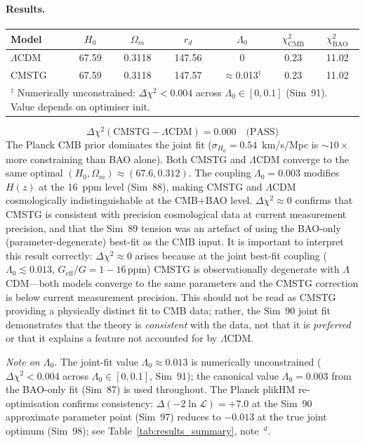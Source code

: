 \documentclass[12pt,a4paper]{article}
\begin{document}
\paragraph{Results.}
\begin{center}
\begin{tabular}{lcccccc}
\toprule
Model & $H_0$ & $\Omega_m$ & $r_d$ & $\Lambda_0$ & $\chi^2_{\mathrm{CMB}}$ & $\chi^2_{\mathrm{BAO}}$ \\
\midrule
$\Lambda$CDM & 67.59 & 0.3118 & 147.56 & 0 & 0.23 & 11.02 \\
CMSTG & 67.59 & 0.3118 & 147.57 & $\approx$0.013$^\dagger$ & 0.23 & 11.02 \\
\bottomrule
\multicolumn{7}{l}{\footnotesize $^\dagger$ Numerically unconstrained: $\Delta\chi^2<0.004$ across $\Lambda_0\in[0,0.1]$ (Sim~91). Value depends on optimiser init.} \\
\end{tabular}
\end{center}
\begin{equation*}
\Delta\chi^2(\mathrm{CMSTG} - \Lambda\mathrm{CDM}) = \mathbf{0.000} \quad\text{(PASS)}
\end{equation*}
The Planck CMB prior dominates the joint fit ($\sigma_{H_0} = 0.54$~km/s/Mpc
is $\sim 10\times$ more constraining than BAO alone). Both CMSTG and $\Lambda$CDM
converge to the same optimal $(H_0, \Omega_m) \approx (67.6, 0.312)$. The coupling
$\Lambda_0 = 0.003$ modifies $H(z)$ at the 16~ppm level (Sim~88), making CMSTG
and $\Lambda$CDM cosmologically indistinguishable at the CMB+BAO level.
$\Delta\chi^2 \approx 0$ confirms that CMSTG is consistent with precision cosmological
data at current measurement precision, and that the Sim~89 tension was an artefact
of using the BAO-only (parameter-degenerate) best-fit as the CMB input.
It is important to interpret this result correctly: $\Delta\chi^2 \approx 0$ arises
because at the joint best-fit coupling ($\Lambda_0 \lesssim 0.013$,
$G_{\mathrm{eff}}/G = 1 - 16\,\mathrm{ppm}$) CMSTG is observationally degenerate
with $\Lambda$CDM---both models converge to the same parameters and the CMSTG
correction is below current measurement precision.  This should not be read as
CMSTG providing a physically distinct fit to CMB data; rather, the Sim~90 joint
fit demonstrates that the theory is \emph{consistent} with the data, not that
it is \emph{preferred} or that it explains a feature not accounted for by $\Lambda$CDM.

\emph{Note on $\Lambda_0$.} The joint-fit value $\Lambda_0 \approx 0.013$ is numerically unconstrained ($\Delta\chi^2 < 0.004$ across $\Lambda_0 \in [0,0.1]$, Sim~91); the canonical value $\Lambda_0 = 0.003$ from the BAO-only fit (Sim~87) is used throughout. The Planck plikHM re-optimisation confirms consistency: $\Delta(-2\ln\mathcal{L}) = +7.0$ at the Sim~90 approximate parameter point (Sim~97) reduces to $-0.013$ at the true joint optimum (Sim~98); see Table~\ref{tab:results_summary}, note~$^d$.
\end{document}
